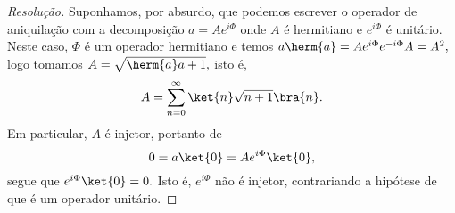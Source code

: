 \begin{proof}[Resolução]
   Suponhamos, por absurdo, que podemos escrever o operador de aniquilação com a decomposição \(a = A e^{i \Phi}\) onde \(A\) é hermitiano e \(e^{i\Phi}\) é unitário. Neste caso, \(\Phi\) é um operador hermitiano e temos \(a \herm{a} = A e^{i\Phi} e^{-i \Phi} A = A^2,\) logo tomamos \(A = \sqrt{\herm{a}a + 1},\) isto é,
   \begin{equation*}
      A = \sum_{n = 0}^\infty \ket{n} \sqrt{n+1} \bra{n}.
   \end{equation*}
   Em particular, \(A\) é injetor, portanto de
   \begin{equation*}
      0 = a\ket{0} = A e^{i\Phi} \ket{0},
   \end{equation*}
   segue que \(e^{i\Phi} \ket{0} = 0.\) Isto é, \(e^{i\Phi}\) não é injetor, contrariando a hipótese de que é um operador unitário.


\end{proof}
